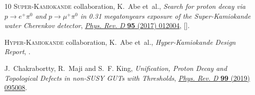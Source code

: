 \documentclass[11pt]{article}
\begin{document}
\begin{thebibliography}{10}
{\scshape Super-Kamiokande} collaboration, K.~Abe et~al., \emph{{Search for
  proton decay via $p \to e^+\pi^0$ and $p \to \mu^+\pi^0$ in 0.31
  megaton\textperiodcentered{}years exposure of the Super-Kamiokande water
  Cherenkov detector}},
  \href{https://doi.org/10.1103/PhysRevD.95.012004}{\emph{Phys. Rev. D}
  {\bfseries 95} (2017) 012004},
  [\href{https://arxiv.org/abs/1610.03597}{{}}].

{\scshape Hyper-Kamiokande} collaboration, K.~Abe et~al.,
  \emph{{Hyper-Kamiokande Design Report}},
  \href{https://arxiv.org/abs/1805.04163}{{}}.

J.~Chakrabortty, R.~Maji and S.~F. King, \emph{{Unification, Proton Decay and
  Topological Defects in non-SUSY GUTs with Thresholds}},
  \href{https://doi.org/10.1103/PhysRevD.99.095008}{\emph{Phys. Rev. D}
  {\bfseries 99} (2019) 095008}.

\end{thebibliography}\endgroup
\end{document}
